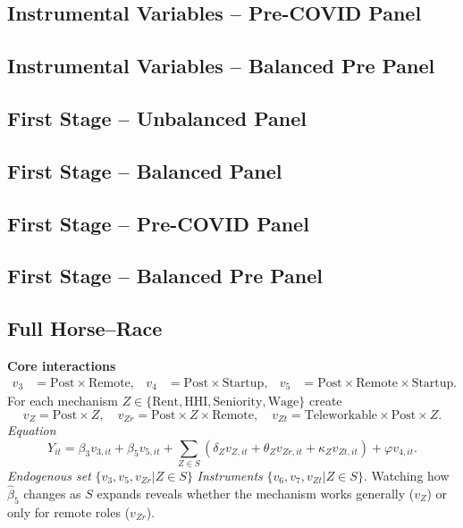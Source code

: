 \documentclass{article}
\newcommand{\cleanedresultsdir}{../../results/cleaned}
\begin{document}
\subsection{Instrumental Variables -- Pre-COVID Panel}

\subsection{Instrumental Variables -- Balanced Pre Panel}


\subsection{First Stage -- Unbalanced Panel}


\subsection{First Stage -- Balanced Panel}


\subsection{First Stage -- Pre-COVID Panel}

\subsection{First Stage -- Balanced Pre Panel}


\clearpage
\subsection*{Full Horse–Race}
\textbf{Core interactions}
\[\begin{aligned}
 v_3 &= \text{Post}\!\times\!\text{Remote}, &
 v_4 &= \text{Post}\!\times\!\text{Startup}, &
 v_5 &= \text{Post}\!\times\!\text{Remote}\!\times\!\text{Startup}. 
\end{aligned}\]
For each mechanism $Z\in\{\text{Rent},\text{HHI},\text{Seniority},\text{Wage}\}$ create
\[v_Z = \text{Post}\!\times\! Z,\quad v_{Zr}=\text{Post}\!\times\! Z\!\times\!\text{Remote},\quad v_{Zt}=\text{Teleworkable}\!\times\!\text{Post}\!\times\! Z.\]
\emph{Equation}
\[Y_{it}=\beta_3 v_{3,it}+\beta_5 v_{5,it}+\sum_{Z\in S}(\delta_Z v_{Z,it}+\theta_Z v_{Zr,it}+\kappa_Z v_{Zt,it})+\varphi v_{4,it}.
\]
\emph{Endogenous set}\; $\{v_3,v_5,v_{Zr}|Z\in S\}$ \quad\emph{Instruments}\; $\{v_6,v_7,v_{Zt}|Z\in S\}$.
Watching how $\widehat\beta_5$ changes as $S$ expands reveals whether the mechanism works generally ($v_Z$) or only for remote roles ($v_{Zr}$).
\end{document}
